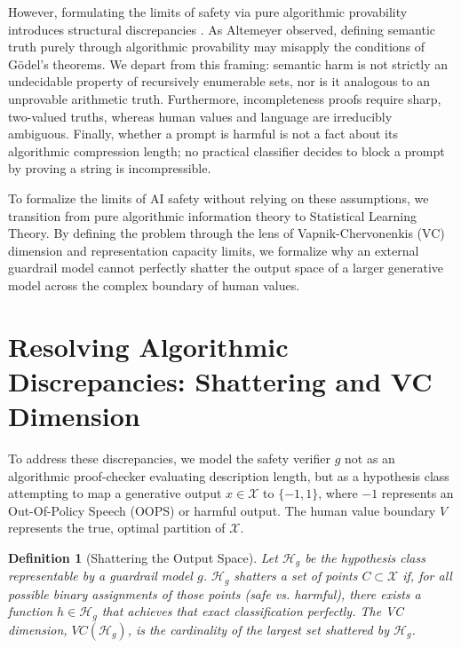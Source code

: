 \documentclass[11pt,twoside,letterpaper]{article}
\newtheorem{definition}{Definition}
\begin{document}
However, formulating the limits of safety via pure algorithmic provability introduces structural discrepancies \cite{altemeyer2026}. As Altemeyer observed, defining semantic truth purely through algorithmic provability may misapply the conditions of Gödel's theorems. 
We depart from this framing: semantic harm is not strictly an undecidable property of recursively enumerable sets, nor is it analogous to an unprovable arithmetic truth. 
Furthermore, incompleteness proofs require sharp, two-valued truths, whereas human values and language are irreducibly ambiguous. Finally, whether a prompt is harmful is not a fact about its algorithmic compression length; no practical classifier decides to block a prompt by proving a string is incompressible. 

To formalize the limits of AI safety without relying on these assumptions, we transition from pure algorithmic information theory to Statistical Learning Theory. 
By defining the problem through the lens of Vapnik-Chervonenkis (VC) dimension and representation capacity limits, we formalize why an external guardrail model cannot perfectly shatter the output space of a larger generative model across the complex boundary of human values.

\section{Resolving Algorithmic Discrepancies: Shattering and VC Dimension}

To address these discrepancies, we model the safety verifier $g$ not as an algorithmic proof-checker evaluating description length, but as a hypothesis class attempting to map a generative output $x \in \mathcal{X}$ to $\{-1, 1\}$, where $-1$ represents an Out-Of-Policy Speech (OOPS) or harmful output. 
The human value boundary $V$ represents the true, optimal partition of $\mathcal{X}$.

\begin{definition}[Shattering the Output Space]
Let $\mathcal{H}_g$ be the hypothesis class representable by a guardrail model $g$. $\mathcal{H}_g$ \textit{shatters} a set of points $C \subset \mathcal{X}$ if, for all possible binary assignments of those points (safe vs. harmful), there exists a function $h \in \mathcal{H}_g$ that achieves that exact classification perfectly. The VC dimension, $VC(\mathcal{H}_g)$, is the cardinality of the largest set shattered by $\mathcal{H}_g$.
\end{definition}
\end{document}
